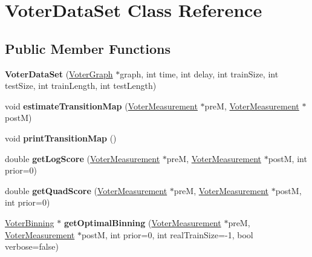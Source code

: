 \hypertarget{class_voter_data_set}{\section{Voter\-Data\-Set Class Reference}
\label{class_voter_data_set}
}
\subsection*{Public Member Functions}
\begin{DoxyCompactItemize}
\item 
\hypertarget{class_voter_data_set_a85862f252fad49f884e47db2f5a5674c}{{\bfseries Voter\-Data\-Set} (\hyperlink{class_voter_graph}{Voter\-Graph} $\ast$graph, int time, int delay, int train\-Size, int test\-Size, int train\-Length, int test\-Length)}\label{class_voter_data_set_a85862f252fad49f884e47db2f5a5674c}

\item 
\hypertarget{class_voter_data_set_af70ae2bf803da48a2d9e8d63fe3ff734}{void {\bfseries estimate\-Transition\-Map} (\hyperlink{class_voter_measurement}{Voter\-Measurement} $\ast$pre\-M, \hyperlink{class_voter_measurement}{Voter\-Measurement} $\ast$post\-M)}\label{class_voter_data_set_af70ae2bf803da48a2d9e8d63fe3ff734}

\item 
\hypertarget{class_voter_data_set_ad012aba1d9993327593f7cddc325d51c}{void {\bfseries print\-Transition\-Map} ()}\label{class_voter_data_set_ad012aba1d9993327593f7cddc325d51c}

\item 
\hypertarget{class_voter_data_set_a2a979b77b09ed30a92335423ebe21d12}{double {\bfseries get\-Log\-Score} (\hyperlink{class_voter_measurement}{Voter\-Measurement} $\ast$pre\-M, \hyperlink{class_voter_measurement}{Voter\-Measurement} $\ast$post\-M, int prior=0)}\label{class_voter_data_set_a2a979b77b09ed30a92335423ebe21d12}

\item 
\hypertarget{class_voter_data_set_a5c641ff7d0ce7a150ef8ebd46bc4da5e}{double {\bfseries get\-Quad\-Score} (\hyperlink{class_voter_measurement}{Voter\-Measurement} $\ast$pre\-M, \hyperlink{class_voter_measurement}{Voter\-Measurement} $\ast$post\-M, int prior=0)}\label{class_voter_data_set_a5c641ff7d0ce7a150ef8ebd46bc4da5e}

\item 
\hypertarget{class_voter_data_set_aaab30a1a42a992b61a66107353bb89c6}{\hyperlink{class_voter_binning}{Voter\-Binning} $\ast$ {\bfseries get\-Optimal\-Binning} (\hyperlink{class_voter_measurement}{Voter\-Measurement} $\ast$pre\-M, \hyperlink{class_voter_measurement}{Voter\-Measurement} $\ast$post\-M, int prior=0, int real\-Train\-Size=-\/1, bool verbose=false)}\label{class_voter_data_set_aaab30a1a42a992b61a66107353bb89c6}

\end{DoxyCompactItemize}
